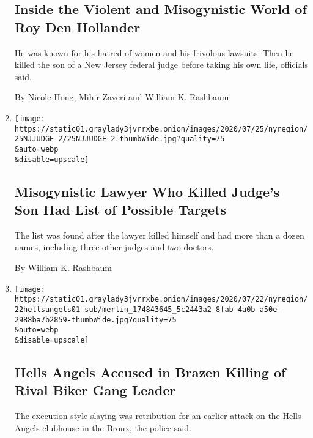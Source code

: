 \begin{enumerate}
  \hypertarget{inside-the-violent-and-misogynistic-world-of-roy-den-hollander}{%
  \subsection{Inside the Violent and Misogynistic World of Roy Den
  Hollander}\label{inside-the-violent-and-misogynistic-world-of-roy-den-hollander}}

  He was known for his hatred of women and his frivolous lawsuits. Then
  he killed the son of a New Jersey federal judge before taking his own
  life, officials said.

  By Nicole Hong, Mihir Zaveri and William K. Rashbaum
\item
  \href{/2020/07/25/nyregion/roy-den-hollander-esther-salas-list.html}{}

  \texttt{[image: https://static01.graylady3jvrrxbe.onion/images/2020/07/25/nyregion/25NJJUDGE-2/25NJJUDGE-2-thumbWide.jpg?quality=75\\\&auto=webp\\\&disable=upscale]}

  \hypertarget{misogynistic-lawyer-who-killed-judges-son-had-list-of-possible-targets}{%
  \subsection{Misogynistic Lawyer Who Killed Judge's Son Had List of
  Possible
  Targets}\label{misogynistic-lawyer-who-killed-judges-son-had-list-of-possible-targets}}

  The list was found after the lawyer killed himself and had more than a
  dozen names, including three other judges and two doctors.

  By William K. Rashbaum
\item
  \href{/2020/07/22/nyregion/hells-angels-bronx-pagans-murder.html}{}

  \texttt{[image: https://static01.graylady3jvrrxbe.onion/images/2020/07/22/nyregion/22hellsangels01-sub/merlin\_174843645\_5c2443a2-8fab-4a0b-a50e-2988ba7b2859-thumbWide.jpg?quality=75\\\&auto=webp\\\&disable=upscale]}

  \hypertarget{hells-angels-accused-in-brazen-killing-of-rival-biker-gang-leader}{%
  \subsection{Hells Angels Accused in Brazen Killing of Rival Biker Gang
  Leader}\label{hells-angels-accused-in-brazen-killing-of-rival-biker-gang-leader}}

  The execution-style slaying was retribution for an earlier attack on
  the Hells Angels clubhouse in the Bronx, the police said.


\end{enumerate}
